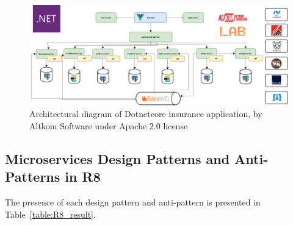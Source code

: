 \documentclass{Configuration_Files/PoliMi3i_thesis}
\begin{document}
\begin{figure}[H]
\centering
\includegraphics[width=1\textwidth]{myImages/R8.png}
\caption{Architectural diagram of Dotnetcore insurance application, by Altkom Software under Apache 2.0 license}
\label{fig:R8_arch}
\end{figure}

\subsection{Microservices Design Patterns and Anti-Patterns in R8}
\label{subsec:R8_detection}

The presence of each design pattern and anti-pattern is presented in Table~\ref{table:R8_result}.
\end{document}
